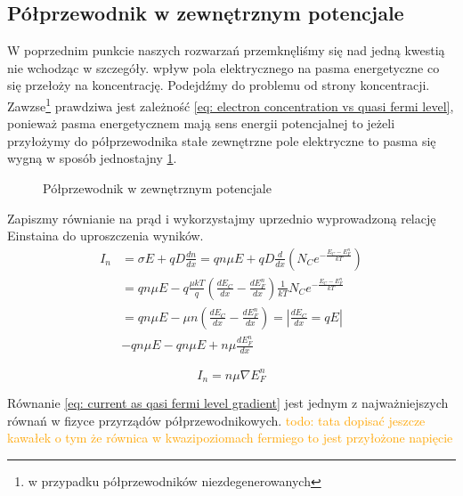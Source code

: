     \subsection{Półprzewodnik w zewnętrznym potencjale}
        W poprzednim punkcie naszych rozwarzań przemknęliśmy się nad jedną kwestią nie wchodząc w szczegóły. wpływ pola elektrycznego na pasma energetyczne co się przełoży na koncentrację. Podejdźmy do problemu od strony koncentracji. Zawzse\footnote{w przypadku półprzewodników niezdegenerowanych} prawdziwa jest zależność \ref{eq: electron concentration vs quasi fermi level}, ponieważ pasma energetycznem mają sens energii potencjalnej to jeżeli przyłożymy do półprzewodnika stałe zewnętrzne pole elektryczne to pasma się wygną w sposób jednostajny \ref{fig: semiconductor in external voltage}. 
        \begin{figure}[H]
            \centering
            \caption{Półprzewodnik w zewnętrznym potencjale}
            \label{fig: semiconductor in external voltage}
        \end{figure}
        \noindent Zapiszmy równianie na prąd i wykorzystajmy uprzednio wyprowadzoną relację Einstaina do uproszczenia wyników. 
        \begin{align*}
            I_n &= \sigma E + qD\frac{dn}{dx} = qn\mu E + qD\frac{d}{dx}\left(N_Ce^{- \frac{E_C - E_F^n}{kT} }\right) \\
            &= qn\mu E - q \frac{\mu kT}{q}\left(\frac{d E_C}{dx} -\frac{d E_F^n}{dx} \right) \frac{1}{kT}N_Ce^{- \frac{E_C - E_F^n}{kT} } \\
            &= qn\mu E - \mu n \left(\frac{d E_C}{dx} -\frac{d E_F^n}{dx} \right) =  \left|\frac{d E_C}{dx} = qE \right| \\
            &- qn \mu E - qn \mu E + n\mu \frac{d E_F^n}{dx}
        \end{align*}                
        \begin{tcolorbox}[colback=black!15!white, colframe=gray!25!black, title=Prąd a kwazipoziom Fermiego]
            \begin{equation}
                I_n = n\mu\nabla E_F^n \label{eq: current as qasi fermi level gradient}
            \end{equation}
        \end{tcolorbox}
        \noindent Równanie \ref{eq: current as qasi fermi level gradient} jest jednym z najważniejszych równań w fizyce przyrządów półprzewodnikowych. 
        \newline \newline
    \noindent \textcolor{orange}{todo: tata dopisać jeszcze kawałek o tym że równica w kwazipoziomach fermiego to jest przyłożone napięcie}